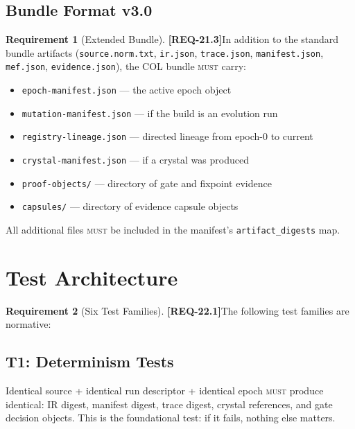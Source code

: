 \documentclass[11pt,a4paper,twoside]{article}
\theoremstyle{definition}
\newtheorem{requirement}{Requirement}[section]
\theoremstyle{remark}
\newcommand{\req}[1]{\textbf{\textcolor{reqred}{[REQ-#1]}}}
\newcommand{\must}{\textsc{must}}
\begin{document}
\subsection{Bundle Format v3.0}

\begin{requirement}[Extended Bundle]
\label{req:bundle-format}
\req{21.3}\quad In addition to the standard bundle artifacts (\texttt{source.norm.txt}, \texttt{ir.json}, \texttt{trace.json}, \texttt{manifest.json}, \texttt{mef.json}, \texttt{evidence.json}), the COL bundle \must{} carry:
\begin{itemize}[nosep]
  \item \texttt{epoch-manifest.json} --- the active epoch object
  \item \texttt{mutation-manifest.json} --- if the build is an evolution run
  \item \texttt{registry-lineage.json} --- directed lineage from epoch-0 to current
  \item \texttt{crystal-manifest.json} --- if a crystal was produced
  \item \texttt{proof-objects/} --- directory of gate and fixpoint evidence
  \item \texttt{capsules/} --- directory of evidence capsule objects
\end{itemize}
All additional files \must{} be included in the manifest's \texttt{artifact\_digests} map.
\end{requirement}



\section{Test Architecture}
\label{sec:tests}

\begin{requirement}[Six Test Families]
\label{req:test-families}
\req{22.1}\quad The following test families are normative:
\end{requirement}

\subsection{T1: Determinism Tests}

Identical source + identical run descriptor + identical epoch \must{} produce identical: IR digest, manifest digest, trace digest, crystal references, and gate decision objects. This is the foundational test: if it fails, nothing else matters.
\end{document}
